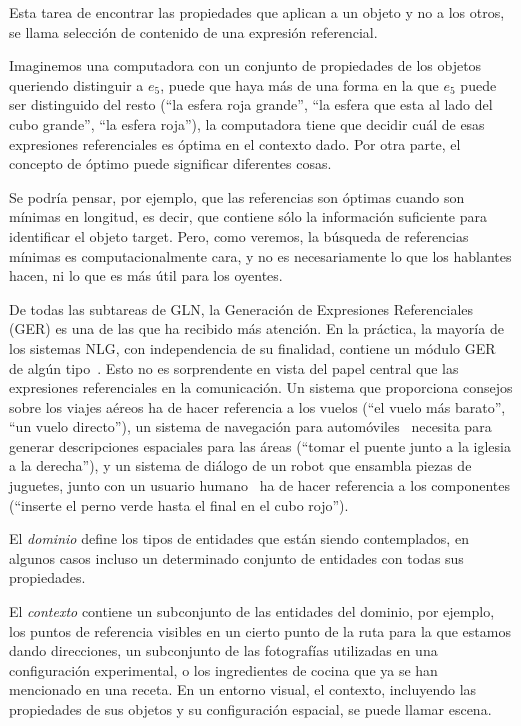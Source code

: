 Esta tarea de encontrar las propiedades que aplican a un objeto y no a los otros, se llama selecci\'on de contenido de una expresi\'on referencial.  

Imaginemos una computadora con un conjunto de propiedades de los objetos queriendo distinguir a $e_5$, puede que haya m\'as de una forma en la que $e_5$ puede ser distinguido del resto (``la esfera roja grande'', ``la esfera que esta al lado del cubo grande'', ``la esfera roja''), la computadora tiene que decidir cu\'al de esas expresiones referenciales es \'optima en el contexto dado. Por otra parte, el concepto de \'optimo puede significar diferentes cosas.

Se podr\'{i}a pensar, por ejemplo, que las referencias son \'optimas cuando son m\'{i}nimas en longitud, es decir, 
que contiene s\'olo la informaci\'on suficiente para identificar el objeto target. Pero, como veremos, la b\'usqueda de referencias m\'{i}nimas
es computacionalmente cara, y no es necesariamente lo que los hablantes hacen, ni lo que es m\'as \'util para los oyentes.

De todas las subtareas de GLN, la Generaci\'on de Expresiones Referenciales (GER) es
una de las que ha recibido m\'as atenci\'on. En la pr\'actica, la mayor\'ia de los
sistemas NLG, con independencia de su finalidad, contiene un m\'odulo GER de alg\'un tipo~\cite{Mellish2004}. Esto no es sorprendente
en vista del papel central que las expresiones referenciales en la comunicaci\'on. Un sistema que proporciona
consejos sobre los viajes a\'ereos \cite{white2010generating} ha de hacer referencia a los vuelos (``el
vuelo m\'as barato'', ``un vuelo directo''), un sistema de navegaci\'on para autom\'oviles~\cite{Drager:2012:GLN:2380816.2380908}
necesita para generar descripciones espaciales para las \'areas (``tomar el puente junto a la iglesia a la derecha''),
y un sistema de di\'alogo de un robot que ensambla piezas de juguetes, junto con un usuario humano~\cite{foster-etal-ijcai2009} ha de hacer referencia a los componentes (``inserte el perno verde hasta el final en el cubo rojo'').

El {\it dominio} define los tipos de entidades que est\'an siendo contemplados, en algunos
casos incluso un determinado conjunto de entidades con todas sus propiedades.

El {\it contexto} contiene un subconjunto de las entidades del dominio, por ejemplo, los puntos de referencia visibles en un cierto punto de la ruta para la que estamos dando direcciones, un subconjunto de las fotograf\'ias utilizadas en una configuraci\'on experimental, o los ingredientes de cocina que ya se han mencionado en una receta. En un entorno visual, el contexto, incluyendo las
propiedades de sus objetos y su configuraci\'on espacial, se puede llamar escena. 

